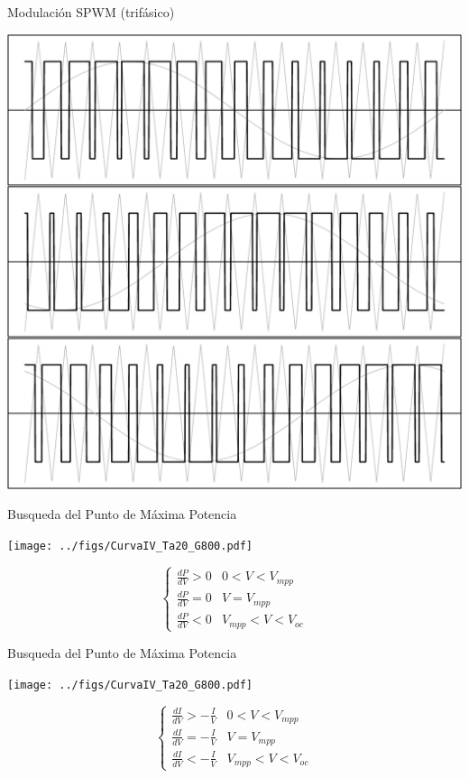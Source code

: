\documentclass[aspectratio=169, usenames,svgnames,dvipsnames]{beamer}
\begin{document}
\begin{frame}[label={sec:org1c3bbef}]{Modulación SPWM (trifásico)}
\begin{center}
\includegraphics[height=0.9\textheight]{../figs/SPWMTrifasico_shaded.pdf}
\end{center}
\end{frame}
\begin{frame}[label={sec:orgb5c919f}]{Busqueda del Punto de Máxima Potencia}
\begin{center}
\texttt{[image: ../figs/CurvaIV\_Ta20\_G800.pdf]}
\end{center}

$$\begin{cases}
      \frac{dP}{dV}>0 & 0<V<V_{mpp}\\
      \frac{dP}{dV}=0 & V=V_{mpp}\\
      \frac{dP}{dV}<0 & V_{mpp}<V<V_{oc}\end{cases}$$
\end{frame}
\begin{frame}[label={sec:org1c19fb6}]{Busqueda del Punto de Máxima Potencia}
\begin{center}
\texttt{[image: ../figs/CurvaIV\_Ta20\_G800.pdf]}
\end{center}

$$\begin{cases}
      \frac{dI}{dV}>-\frac{I}{V} & 0<V<V_{mpp}\\
      \frac{dI}{dV}=-\frac{I}{V} & V=V_{mpp}\\
      \frac{dI}{dV}<-\frac{I}{V} & V_{mpp}<V<V_{oc}\end{cases}$$
\end{frame}
\end{document}
